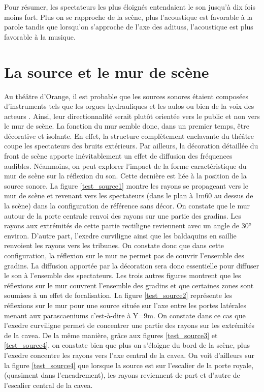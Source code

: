 Pour résumer, les spectateurs les plus éloignés entendaient le son jusqu'à dix fois moins fort. Plus on se rapproche de la scène, plus l'acoustique est favorable à la parole tandis que lorsqu'on s'approche de l'axe des \glspl{aditus}, l'acoustique est plus favorable à la musique.

\section{La source et le mur de scène}

Au théâtre d'Orange, il est probable que les sources sonores étaient composées d'instruments tels que les orgues hydrauliques \cite[p.65]{rocconi} et les \gls{aulos} \cite[p.33]{rocconi} ou bien de la voix des acteurs \cite[]{voixRomain}. Ainsi, leur directionnalité serait plutôt orientée vers le public et non vers le mur de scène. La fonction du mur semble donc, dans un premier temps, être décorative et isolante. En effet, la structure complètement enclavante du théâtre coupe les spectateurs des bruits extérieurs. Par ailleurs, la décoration détaillée du front de scène apporte inévitablement un effet de diffusion des fréquences audibles. Néanmoins, on peut explorer l'impact de la forme caractéristique du mur de scène sur la réflexion du son. Cette dernière est liée à la position de la source sonore. La figure \ref{test_source1} montre les rayons se propageant vers le mur de scène et revenant vers les spectateurs (dans le plan à 1m60 au dessus de la scène) dans la configuration de référence sans décor. On constate que le mur autour de la porte centrale renvoi des rayons sur une partie des gradins. Les rayons aux extrémités de cette partie rectiligne reviennent avec un angle de 30° environ. D'autre part, l'\gls{exedre} curviligne ainsi que les baldaquins en saillie renvoient les rayons vers les tribunes. On constate donc que dans cette configuration, la réflexion sur le mur ne permet pas de couvrir l'ensemble des gradins. La diffusion apportée par la décoration sera donc essentielle pour diffuser le son à l'ensemble des spectateurs. Les trois autres figures montrent que les réflexions sur le mur couvrent l'ensemble des gradins et que certaines zones sont soumises à un effet de focalisation. La figure \ref{test_source2} représente les réflexions sur le mur pour une source située sur l'axe entre les portes latérales menant aux \glspl{parascaenium} c'est-à-dire à Y=9m. On constate dans ce cas que l'\gls{exedre} curviligne permet de concentrer une partie des rayons sur les extrémités de la \gls{cavea}. De la même manière, grâce aux figures \ref{test_source3} et \ref{test_source4}, on constate bien que plus on s'éloigne du bord de la scène, plus l'\gls{exedre} concentre les rayons vers l'axe central de la \gls{cavea}. On voit d'ailleurs sur la figure \ref{test_source4} que lorsque la source est sur l'escalier de la porte royale, (quasiment dans l'encadrement), les rayons reviennent de part et d'autre de l'escalier central de la \gls{cavea}. 

